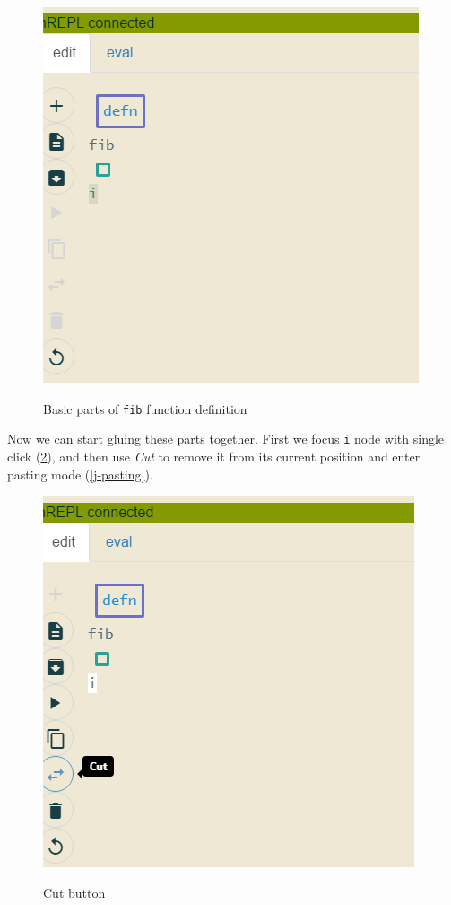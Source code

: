 \documentclass[11pt]{scrartcl}
\begin{document}
\begin{figure}[hbt]
  \includegraphics[scale=0.3]{img/j-fib_parts}
  \label{j-fib_parts}
  \caption{Basic parts of \lstinline{fib} function definition}
\end{figure}

Now we can start gluing these parts together. First we focus \lstinline|i| node
with single click (\ref{j-cut}), and then use \textit{Cut} to remove it from its current
position and enter pasting mode (\ref{j-pasting}).

\begin{figure}[hbt]
  \includegraphics[scale=0.3]{img/j-cut}
  \label{j-cut}
  \caption{Cut button}
\end{figure}
\end{document}
